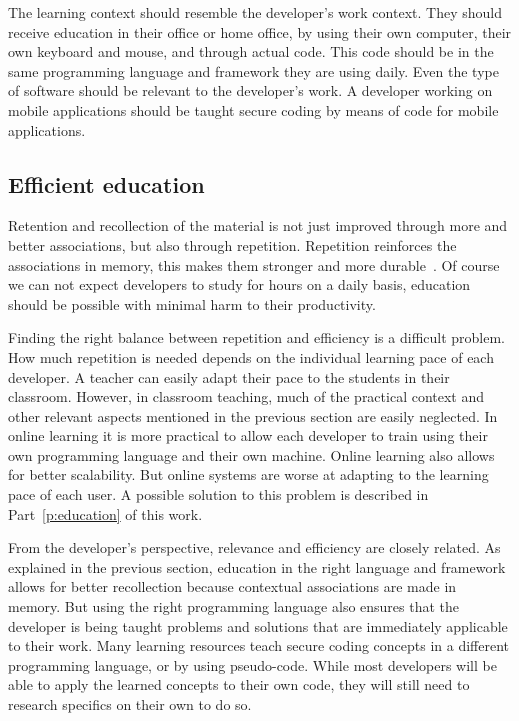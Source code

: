 The learning context should resemble the developer's work context. They should receive education in their office or home office, by using their own computer, their own keyboard and mouse, and through actual code. This code should be in the same programming language and framework they are using daily. Even the type of software should be relevant to the developer's work. A developer working on mobile applications should be taught secure coding by means of code for mobile applications.

\subsection{Efficient education}
Retention and recollection of the material is not just improved through more and better associations, but also through repetition. Repetition reinforces the associations in memory, this makes them stronger and more durable~\citep{dirksen2015design}.
Of course we can not expect developers to study for hours on a daily basis, education should be possible with minimal harm to their productivity.

Finding the right balance between repetition and efficiency is a difficult problem. How much repetition is needed depends on the individual learning pace of each developer. A teacher can easily adapt their pace to the students in their classroom.
However, in classroom teaching, much of the practical context and other relevant aspects mentioned in the previous section are easily neglected. In online learning it is more practical to allow each developer to train using their own programming language and their own machine. Online learning also allows for better scalability. But online systems are worse at adapting to the learning pace of each user. A possible solution to this problem is described in Part~\ref{p:education} of this work.

From the developer's perspective, relevance and efficiency are closely related.
As explained in the previous section, education in the right language and framework allows for better recollection because contextual associations are made in memory. But using the right programming language also ensures that the developer is being taught problems and solutions that are immediately applicable to their work.
Many learning resources teach secure coding concepts in a different programming language, or by using pseudo-code. While most developers will be able to apply the learned concepts to their own code, they will still need to research specifics on their own to do so.

